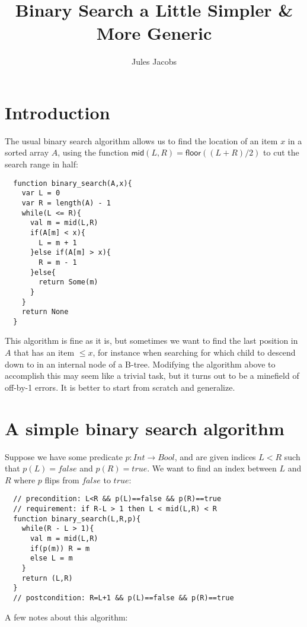 \documentclass[a4paper, 11pt]{article}
\title{Binary Search a Little Simpler \& More Generic}
\author{Jules Jacobs}
\begin{document}
\maketitle

\section{Introduction}

The usual binary search algorithm allows us to find the location of an item $x$ in a sorted array $A$, using the function $\mathsf{mid}(L,R) = \mathsf{floor}((L+R)/2)$ to cut the search range in half:

\begin{lstlisting}
  function binary_search(A,x){
    var L = 0
    var R = length(A) - 1
    while(L <= R){
      val m = mid(L,R)
      if(A[m] < x){
        L = m + 1
      }else if(A[m] > x){
        R = m - 1
      }else{
        return Some(m)
      }
    }
    return None
  }
\end{lstlisting}

This algorithm is fine as it is, but sometimes we want to find the last position in $A$ that has an item $\leq x$, for instance when searching for which child to descend down to in an internal node of a B-tree. Modifying the algorithm above to accomplish this may seem like a trivial task, but it turns out to be a minefield of off-by-1 errors. It is better to start from scratch and generalize.

\section{A simple binary search algorithm}

Suppose we have some predicate $p : Int \to Bool$, and are given indices $L < R$ such that $p(L) = false$ and $p(R) = true$. We want to find an index between $L$ and $R$ where $p$ flips from $false$ to $true$:

\begin{lstlisting}
  // precondition: L<R && p(L)==false && p(R)==true
  // requirement: if R-L > 1 then L < mid(L,R) < R
  function binary_search(L,R,p){
    while(R - L > 1){
      val m = mid(L,R)
      if(p(m)) R = m
      else L = m
    }
    return (L,R)
  }
  // postcondition: R=L+1 && p(L)==false && p(R)==true
\end{lstlisting}

\noindent A few notes about this algorithm:
\end{document}
